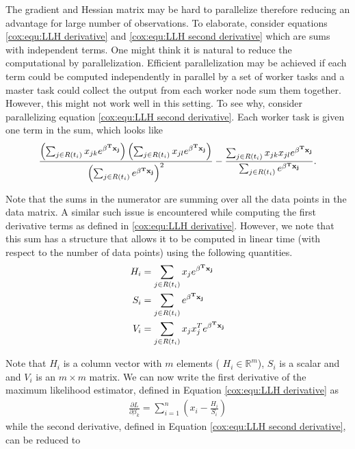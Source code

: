 The gradient and Hessian matrix may be hard to parallelize therefore reducing an
advantage for large number of observations. To elaborate, consider equations
\ref{cox:equ:LLH derivative} and \ref{cox:equ:LLH second derivative} which are
sums with independent terms. One might think it is natural to reduce the
computational by parallelization. Efficient parallelization may be achieved if
each term could be computed independently in parallel by a set of worker tasks
and a master task could collect the output from each worker node sum them
together. However, this might not work well in this setting. To see why,
consider parallelizing equation \ref{cox:equ:LLH second derivative}.  Each
worker task is given one term in the sum, which looks like
\begin{equation}
 \frac{\left(  \sum_{j \in R(t_i)} x_{jk} e^{\bold{\beta^T x _j} } \right) \left(  \sum_{j \in R(t_i)} x_{jl} e^{\bold{\beta^T x _j} } \right)}{\left( \sum_{j \in R(t_i)} e^{\bold{\beta^T x_j} } \right)^2 }   -  \frac{  \sum_{j \in R(t_i)} x_{jk}x_{jl} e^{\bold{\beta^T x_j} } }{\sum_{j \in R(t_i)} e^{\bold{\beta^T x_j} } }.
\end{equation}

Note that the sums in the numerator are summing over all the data points in the
data matrix. A similar such issue is encountered while computing the first
derivative terms as defined in \ref{cox:equ:LLH derivative}. However, we note
that this sum has a structure that allows it to be computed in linear time (with
respect to the number of data points) using the following quantities.
\begin{align}
H_{i} &=   \sum_{j \in R(t_i)} x_{j} e^{\bold{\beta^T x_j}}\\
S_{i}&=   \sum_{j \in R(t_i)} e^{\bold{\beta^T x_j}} \\
V_{i}&=   \sum_{j \in R(t_i)} x_{j}x_{j}^T e^{\bold{\beta^T x_j} }
\end{align}

Note that $H_{i}$ is a column vector with $m$ elements ( $H_{i}\in
\mathbb{R}^m$), $S_{i}$ is a scalar and and $V_{i}$ is an $m \times m$ matrix.
We can now write the first derivative of the maximum likelihood estimator,
defined in Equation \ref{cox:equ:LLH derivative} as
\begin{align}
\frac{\partial L}{\partial \beta_k} = \sum_{i = 1}^n \left( x_{i} - \frac{H_{i} }{ S_{i}}  \right)
\end{align}
while the second derivative, defined in Equation \ref{cox:equ:LLH second
derivative}, can be reduced to

